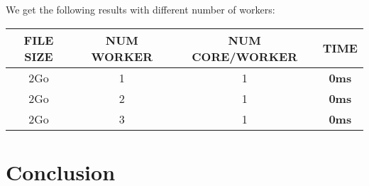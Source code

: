 \documentclass{article}
\begin{document}
\noindent We get the following results with different number of workers: \\
\begin{center}
    \begin{tabular}{||c c c c||} 
    \hline
    FILE SIZE & NUM WORKER & NUM CORE/WORKER & TIME \\ [0.5ex] 
    \hline\hline
    2Go & 1 & 1 & \textbf{0ms} \\ 
    \hline
    2Go & 2 & 1 & \textbf{0ms} \\ 
    \hline
    2Go & 3 & 1 & \textbf{0ms} \\ 
    \hline
    \end{tabular}
\end{center}
\vspace*{0.2cm}

\section{Conclusion}
\end{document}
